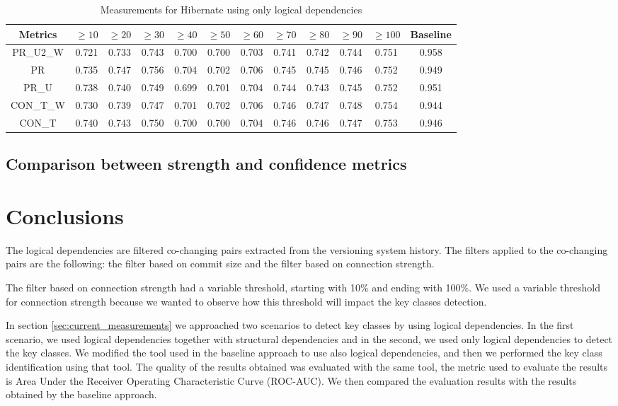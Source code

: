 \documentclass[runningheads]{comsis2}
\begin{document}
\begin{table}[!h]
\setlength\tabcolsep{3.5pt}
\caption{Measurements for Hibernate using only logical dependencies}
\label{tab:measurementshistory:hibernate}
\centering
\begin{tabular}{|c|cccccccccc|c|}
\hline
Metrics &	$\geq10$	&	$\geq20$		&	$\geq30$		&	$\geq40$		&	$\geq50$		&	$\geq60$		&	$\geq70$		&	$\geq80$		&	$\geq90$		&	$\geq100$		&	Baseline \\
\hline

PR\_U2\_W	&	0.721	&	0.733	&	0.743	&	0.700	&	0.700	&	0.703	&	0.741	&	0.742	&	0.744	&	0.751	&	0.958	\\
PR	&	0.735	&	0.747	&	0.756	&	0.704	&	0.702	&	0.706	&	0.745	&	0.745	&	0.746	&	0.752	&	0.949	\\
PR\_U	&	0.738	&	0.740	&	0.749	&	0.699	&	0.701	&	0.704	&	0.744	&	0.743	&	0.745	&	0.752	&	0.951	\\
CON\_T\_W	&	0.730	&	0.739	&	0.747	&	0.701	&	0.702	&	0.706	&	0.746	&	0.747	&	0.748	&	0.754	&	0.944	\\
CON\_T	&	0.740	&	0.743	&	0.750	&	0.700	&	0.700	&	0.704	&	0.746	&	0.746	&	0.747	&	0.753	&	0.946	\\


\hline
\end{tabular}
\end{table}

\subsection{Comparison between strength and confidence metrics}
\label{sec:measure_metrics}

\section{Conclusions}
\label{sec:conclusion}


The logical dependencies are filtered co-changing pairs extracted from the versioning system history. The filters applied to the co-changing pairs are the following: the filter based on commit size and the filter based on connection strength.

The filter based on connection strength had a variable threshold, starting with 10\% and ending with 100\%. We used a variable threshold for connection strength because we wanted to observe how this threshold will impact the key classes detection.

In section \ref{sec:current_measurements} we approached two scenarios to detect key classes by using logical dependencies. In the first scenario, we used logical dependencies together with structural dependencies and in the second, we used only logical dependencies to detect the key classes. We modified the tool used in the baseline approach to use also logical dependencies, and then we performed the key class identification using that tool. 
The quality of the results obtained was evaluated with the same tool, the metric used to evaluate the results is Area Under the Receiver Operating Characteristic Curve (ROC-AUC). We then compared the evaluation results with the results obtained by the baseline approach. 
\end{document}
